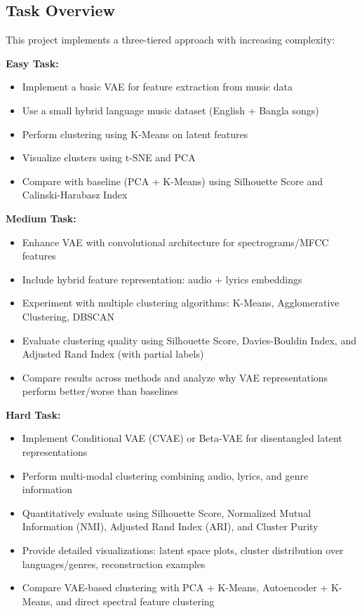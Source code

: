 \documentclass{article}
\begin{document}
\subsection{Task Overview}

This project implements a three-tiered approach with increasing complexity:

\textbf{Easy Task:}
\begin{itemize}
    \item Implement a basic VAE for feature extraction from music data
    \item Use a small hybrid language music dataset (English + Bangla songs)
    \item Perform clustering using K-Means on latent features
    \item Visualize clusters using t-SNE and PCA
    \item Compare with baseline (PCA + K-Means) using Silhouette Score and Calinski-Harabasz Index
\end{itemize}

\textbf{Medium Task:}
\begin{itemize}
    \item Enhance VAE with convolutional architecture for spectrograms/MFCC features
    \item Include hybrid feature representation: audio + lyrics embeddings
    \item Experiment with multiple clustering algorithms: K-Means, Agglomerative Clustering, DBSCAN
    \item Evaluate clustering quality using Silhouette Score, Davies-Bouldin Index, and Adjusted Rand Index (with partial labels)
    \item Compare results across methods and analyze why VAE representations perform better/worse than baselines
\end{itemize}

\textbf{Hard Task:}
\begin{itemize}
    \item Implement Conditional VAE (CVAE) or Beta-VAE for disentangled latent representations
    \item Perform multi-modal clustering combining audio, lyrics, and genre information
    \item Quantitatively evaluate using Silhouette Score, Normalized Mutual Information (NMI), Adjusted Rand Index (ARI), and Cluster Purity
    \item Provide detailed visualizations: latent space plots, cluster distribution over languages/genres, reconstruction examples
    \item Compare VAE-based clustering with PCA + K-Means, Autoencoder + K-Means, and direct spectral feature clustering
\end{itemize}
\end{document}
